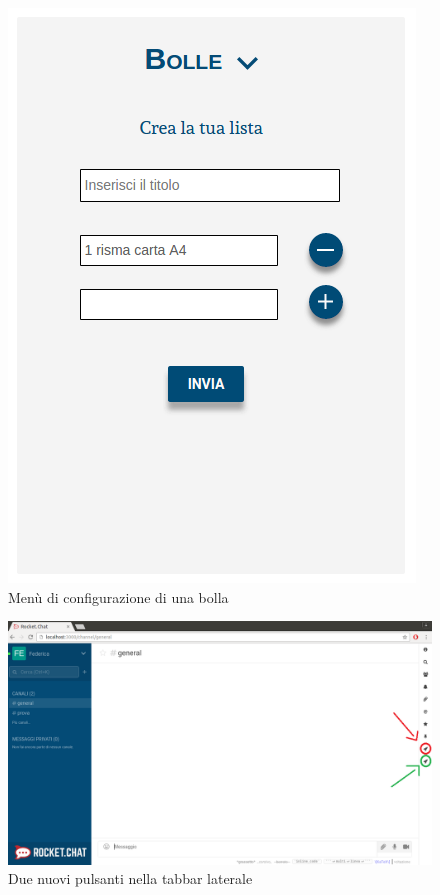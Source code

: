 \begin{frame}
	\begin{figure}
		\begin{center}
			\caption{Menù di configurazione di una bolla}
			\includegraphics[scale=0.35]{img/mockup_3.png}
		\end{center}
	\end{figure}	
\end{frame}

\begin{frame}
	\begin{figure}
		\begin{center}
			\caption{Due nuovi pulsanti nella tabbar laterale}
			\includegraphics[scale=0.23]{img/f3.png}
		\end{center}
	\end{figure}	
\end{frame}


